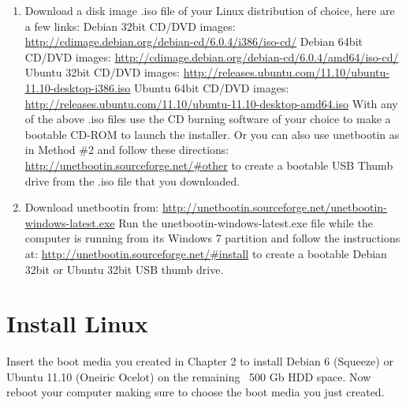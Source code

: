 \documentclass[12pt,notitlepage,onecolumn,oneside,openany]{memoir}
\begin{document}
\begin{enumerate}
\item \textsf{Download a disk image .iso file of your Linux distribution of choice, here are a few links:} \newline
\textsf{Debian 32bit CD/DVD images:} \newline
\url{http://cdimage.debian.org/debian-cd/6.0.4/i386/iso-cd/}\newline
\textsf{Debian 64bit CD/DVD images:} \newline
\url{http://cdimage.debian.org/debian-cd/6.0.4/amd64/iso-cd/}\newline
\textsf{Ubuntu 32bit CD/DVD images:} \newline
\url{http://releases.ubuntu.com/11.10/ubuntu-11.10-desktop-i386.iso} \newline
\textsf{Ubuntu 64bit CD/DVD images:} \newline
\url{http://releases.ubuntu.com/11.10/ubuntu-11.10-desktop-amd64.iso} \newline
\newline
\textsf{With any of the above .iso files use the CD burning software of your choice to make a bootable CD-ROM to launch the installer. Or you can also use unetbootin as in Method \#2 and follow these directions:} \newline
\url{http://unetbootin.sourceforge.net/#other} \newline
\textsf{to create a bootable USB Thumb drive from the .iso file that you downloaded.}

\item \textsf{Download unetbootin from:} \newline
\url{http://unetbootin.sourceforge.net/unetbootin-windows-latest.exe}\newline
\textsf{Run the unetbootin-windows-latest.exe file while the computer is running from its Windows 7 partition and follow the instructions at:} \newline
\url{http://unetbootin.sourceforge.net/#install} \newline
\textsf{to create a bootable Debian 32bit or Ubuntu 32bit USB thumb drive.}
\end{enumerate}

\chapter{\textsf{Install Linux}}

\textsf{Insert the boot media you created in Chapter 2 to install Debian 6 (Squeeze) or Ubuntu 11.10 (Oneiric Ocelot) on the remaining ~500 Gb HDD space.  Now reboot your computer making sure to choose the boot media you just created.} \newline
\end{document}
